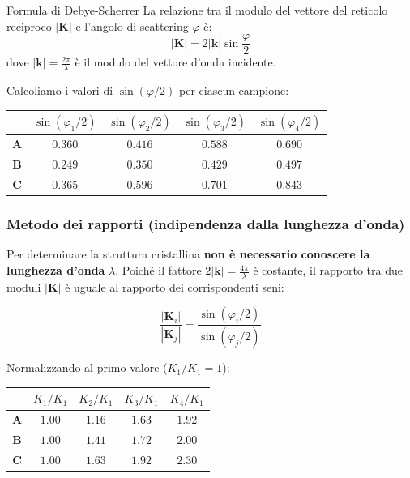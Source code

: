\begin{equazione}{Formula di Debye-Scherrer}
    La relazione tra il modulo del vettore del reticolo reciproco $|\mathbf{K}|$ e l'angolo di scattering $\varphi$ è:
    \begin{equation}
        |\mathbf{K}| = 2|\mathbf{k}|\sin\frac{\varphi}{2}
    \end{equation}
    dove $|\mathbf{k}| = \frac{2\pi}{\lambda}$ è il modulo del vettore d'onda incidente.
\end{equazione}

Calcoliamo i valori di $\sin(\varphi/2)$ per ciascun campione:

\begin{table}[h!]
    \centering
    \begin{tabular}{|c|c|c|c|c|}
        \hline
        & $\sin(\varphi_1/2)$ & $\sin(\varphi_2/2)$ & $\sin(\varphi_3/2)$ & $\sin(\varphi_4/2)$ \\ \hline
        \textbf{A} & $0.360$ & $0.416$ & $0.588$ & $0.690$ \\ \hline
        \textbf{B} & $0.249$ & $0.350$ & $0.429$ & $0.497$ \\ \hline
        \textbf{C} & $0.365$ & $0.596$ & $0.701$ & $0.843$ \\ \hline
    \end{tabular}
\end{table}

\subsubsection{Metodo dei rapporti (indipendenza dalla lunghezza d'onda)}

Per determinare la struttura cristallina \textbf{non è necessario conoscere la lunghezza d'onda} $\lambda$. Poiché il fattore $2|\mathbf{k}| = \frac{4\pi}{\lambda}$ è costante, il rapporto tra due moduli $|\mathbf{K}|$ è uguale al rapporto dei corrispondenti seni:

\begin{equation}
    \frac{|\mathbf{K}_i|}{|\mathbf{K}_j|} = \frac{\sin(\varphi_i/2)}{\sin(\varphi_j/2)}
\end{equation}

Normalizzando al primo valore ($K_1/K_1 = 1$):

\begin{table}[h!]
    \centering
    \begin{tabular}{|c|c|c|c|c|}
        \hline
        & $K_1/K_1$ & $K_2/K_1$ & $K_3/K_1$ & $K_4/K_1$ \\ \hline
        \textbf{A} & $1.00$ & $1.16$ & $1.63$ & $1.92$ \\ \hline
        \textbf{B} & $1.00$ & $1.41$ & $1.72$ & $2.00$ \\ \hline
        \textbf{C} & $1.00$ & $1.63$ & $1.92$ & $2.30$ \\ \hline
    \end{tabular}
\end{table}

